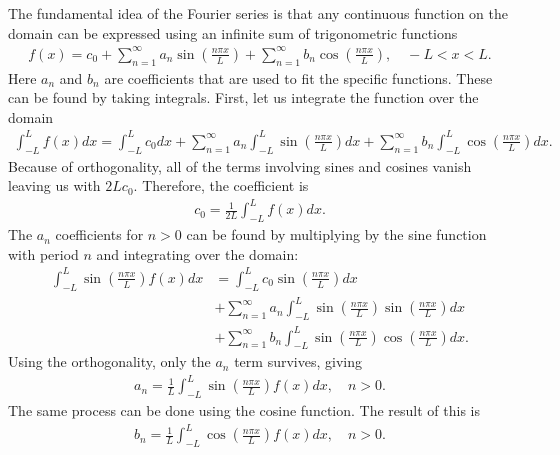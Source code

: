 The fundamental idea of the Fourier series is that any continuous function on the domain can be expressed using an infinite sum of trigonometric functions
\begin{align}
  f(x) = c_0 + \sum_{n=1}^\infty a_n \sin \left( \frac{n \pi x }{ L } \right) + \sum_{n=1}^\infty b_n \cos \left( \frac{n \pi x }{ L } \right) , \quad -L < x < L .
\end{align}
Here $a_n$ and $b_n$ are coefficients that are used to fit the specific functions. These can be found by taking integrals. First, let us integrate the function over the domain
\begin{align}
  \int_{-L}^L f(x) dx = \int_{-L}^L c_0 dx + \sum_{n=1}^\infty a_n \int_{-L}^L \sin \left( \frac{n \pi x }{ L } \right) dx + \sum_{n=1}^\infty b_n \int_{-L}^L \cos \left( \frac{n \pi x }{ L } \right) dx .
\end{align}
Because of orthogonality, all of the terms involving sines and cosines vanish leaving us with $2 L c_0$. Therefore, the coefficient is
\begin{align}
  c_0 = \frac{1}{2L} \int_{-L}^L f(x) dx .
\end{align}
The $a_n$ coefficients for $n > 0$ can be found by multiplying by the sine function with period $n$ and integrating over the domain:
\begin{align}
  \int_{-L}^L  \sin \left( \frac{n \pi x }{ L } \right) f(x) dx &= \int_{-L}^L c_0  \sin \left( \frac{n \pi x }{ L } \right) dx \nonumber \\ &+ \sum_{n=1}^\infty a_n \int_{-L}^L  \sin \left( \frac{n \pi x }{ L } \right) \sin \left( \frac{n \pi x }{ L } \right) dx \nonumber \\ &+ \sum_{n=1}^\infty b_n \int_{-L}^L  \sin \left( \frac{n \pi x }{ L } \right) \cos \left( \frac{n \pi x }{ L } \right) dx .
\end{align}
Using the orthogonality, only the $a_n$ term survives, giving
\begin{align}
  a_n = \frac{1}{L} \int_{-L}^L \sin \left( \frac{n \pi x }{ L } \right) f(x) dx , \quad n > 0.
\end{align}
The same process can be done using the cosine function. The result of this is
\begin{align}
  b_n = \frac{1}{L} \int_{-L}^L \cos \left( \frac{n \pi x }{ L } \right) f(x) dx , \quad n > 0.
\end{align}


